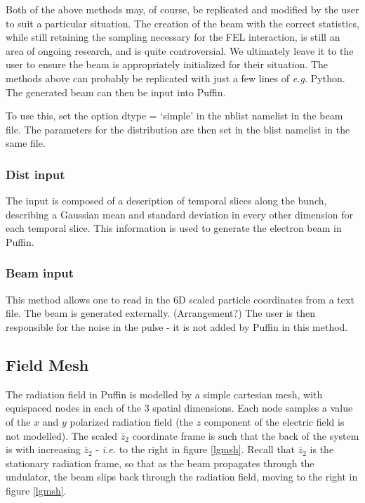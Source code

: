 \documentclass[12pt]{article}%
\begin{document}
Both of the above methods may, of course, be replicated and modified by the user to suit a particular situation. The creation of the beam with the correct statistics, while still retaining the sampling necessary for the FEL interaction, is still an area of ongoing research, and is quite controversial. We ultimately leave it to the user to ensure the beam is appropriately initialized for their situation. The methods above can probably be replicated with just a few lines of \textit{e.g.} Python. The generated beam can then be input into Puffin.

To use this, set the option dtype = `simple' in the nblist namelist in the beam file. The parameters for the distribution are then set in the blist namelist in the same file.

\subsubsection{Dist input}

The input is composed of a description of temporal slices along the bunch, describing a Gaussian mean and standard deviation in every other dimension for each temporal slice. This information is used to generate the electron beam in Puffin.

\subsubsection{Beam input}

This method allows one to read in the 6D scaled particle coordinates from a text file. The beam is generated externally. (Arrangement?) The user is then responsible for the noise in the pulse - it is not added by Puffin in this method.


\subsection{Field Mesh}


The radiation field in Puffin is modelled by a simple cartesian mesh, with equispaced nodes in each of the 3 spatial dimensions. Each node samples a value of the $x$ and $y$ polarized radiation field (the $z$ component of the electric field is not modelled). The scaled $\bar{z}_2$ coordinate frame is such that the back of the system is with increasing $\bar{z}_2$ - \textit{i.e.} to the right in figure \ref{lgmsh}. Recall that $\bar{z}_2$ is the stationary radiation frame, so that as the beam propagates through the undulator, the beam slips back through the radiation field, moving to the right in figure \ref{lgmsh}. 
\end{document}

